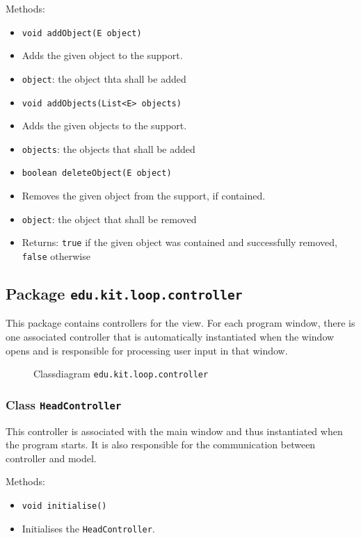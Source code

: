 \documentclass[parskip=full,11pt]{scrartcl}
\begin{document}
Methods:
\begin{itemize}\itemsep -10pt
\item \texttt{void addObject(E object)}
\item[] Adds the given object to the support.
\item[] \texttt{object}: the object thta shall be added

\item \texttt{void addObjects(List<E> objects)}
\item[] Adds the given objects to the support.
\item[] \texttt{objects}: the objects that shall be added

\item \texttt{boolean deleteObject(E object)}
\item[] Removes the given object from the support, if contained.
\item[] \texttt{object}: the object that shall be removed
\item[] Returns: \texttt{true} if the given object was contained and successfully removed, \texttt{false} otherwise
\end{itemize}

\subsection{Package \texttt{edu.kit.loop.controller}}
This package contains controllers for the view. For each program window, there is one associated controller that is automatically instantiated when the window opens and is responsible for processing user input in that window.

\iftrue
\begin{figure}[h]
	\centering
	\fontsize{4}{8}\selectfont
	

	\caption{Classdiagram \texttt{edu.kit.loop.controller}}
\end{figure}
\fi
\subsubsection{Class \texttt{HeadController}}
This controller is associated with the main window and thus instantiated when the program starts. It is also responsible for the communication between controller and model.

Methods:
\begin{itemize}\itemsep -10pt
\item \texttt{void initialise()}
\item[] Initialises the \texttt{HeadController}.
\end{itemize}
\end{document}
